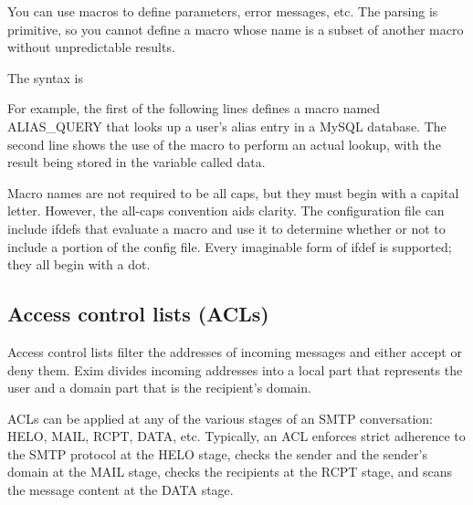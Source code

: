 \protect\hypertarget{part0026_split_046.htmlux5cux23_idIndexMarker2646}{}{}You
can use macros to define parameters, error messages, etc. The parsing is
primitive, so you cannot define a macro whose name is a subset of
another macro without unpredictable results.

The syntax is


For example, the first of the following lines defines a macro named
{ALIAS\_QUERY} that looks up a user's alias entry in a MySQL database.
The second line shows the use of the macro to perform an actual lookup,
with the result being stored in the variable called {data}.


Macro names are not required to be all caps, but they must begin with a
capital letter. However, the all-caps convention aids clarity. The
configuration file can include {ifdef}s that evaluate a macro and use it
to determine whether or not to include a portion of the config file.
Every imaginable form of {ifdef} is supported; they all begin with a
dot.

\protect\hypertarget{part0026_split_047.html}{}{}

\hypertarget{part0026_split_047.htmlux5cux23_idContainer1247}{}
\hypertarget{part0026_split_047.htmlux5cux23calibre_pb_46}{%
\subsection[Access control lists (ACLs)]{\texorpdfstring{Access control
lists
(\protect\hypertarget{part0026_split_047.htmlux5cux23_idTextAnchor1140}{}{}ACLs)}{Access control lists (ACLs)}}\label{part0026_split_047.htmlux5cux23calibre_pb_46}}

\protect\hypertarget{part0026_split_047.htmlux5cux23_idIndexMarker2647}{}{}\protect\hypertarget{part0026_split_047.htmlux5cux23_idIndexMarker2648}{}{}Access
control lists filter the addresses of incoming messages and either
accept or deny them. Exim divides incoming addresses into a local part
that represents the user and a domain part that is the recipient's
domain.

ACLs can be applied at any of the various stages of an SMTP
conversation: HELO, MAIL, RCPT, DATA, etc. Typically, an ACL enforces
strict adherence to the SMTP protocol at the HELO stage, checks the
sender and the sender's domain at the MAIL stage, checks the recipients
at the RCPT stage, and scans the message content at the DATA stage.

